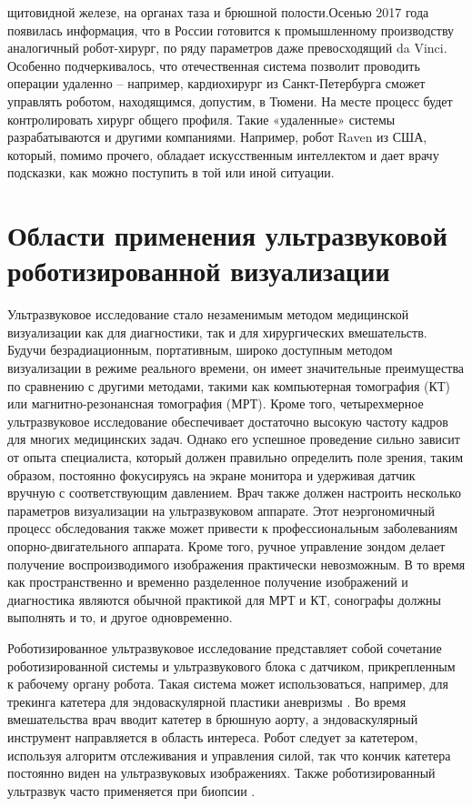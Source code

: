 щитовидной железе, на органах таза и брюшной полости.Осенью 2017 года появилась информация, что в России готовится к промышленному производству аналогичный робот-хирург, по ряду параметров даже превосходящий da Vinci. Особенно подчеркивалось, что отечественная система позволит проводить операции удаленно – например, кардиохирург из Санкт-Петербурга сможет управлять роботом, находящимся, допустим, в Тюмени. На месте процесс будет контролировать хирург общего профиля. Такие «удаленные» системы разрабатываются и другими компаниями. Например, робот Raven из США, который, помимо прочего, обладает искусственным интеллектом и дает врачу подсказки, как можно поступить в той или иной ситуации.


\section{Области применения ультразвуковой роботизированной визуализации}

Ультразвуковое исследование стало незаменимым методом медицинской визуализации как для диагностики, так и для хирургических вмешательств. Будучи безрадиационным, портативным, широко доступным методом визуализации в режиме реального времени, он имеет значительные преимущества по сравнению с другими методами, такими как компьютерная томография (КТ) или магнитно-резонансная томография (МРТ). Кроме того, четырехмерное ультразвуковое исследование обеспечивает достаточно высокую частоту кадров для многих медицинских задач. Однако его успешное проведение сильно зависит от опыта специалиста, который должен правильно определить поле зрения, таким образом, постоянно фокусируясь на экране монитора и удерживая датчик вручную с соответствующим давлением. Врач также должен настроить несколько параметров визуализации на ультразвуковом аппарате. Этот неэргономичный процесс обследования также может привести к профессиональным заболеваниям опорно-двигательного аппарата. Кроме того, ручное управление зондом делает получение воспроизводимого изображения практически невозможным. В то время как пространственно и временно разделенное получение изображений и диагностика являются обычной практикой для МРТ и КТ, сонографы должны выполнять и то, и другое одновременно.

Роботизированное ультразвуковое исследование представляет собой сочетание роботизированной системы и ультразвукового блока с датчиком, прикрепленным к рабочему органу робота. Такая система может использоваться, например, для трекинга катетера для эндоваскулярной пластики аневризмы \cite{litlink5}. Во время вмешательства врач вводит катетер в брюшную аорту, а эндоваскулярный инструмент направляется в область интереса. Робот следует за катетером, используя алгоритм отслеживания и управления силой, так что кончик катетера постоянно виден на ультразвуковых изображениях. Также роботизированный ультразвук часто применяется при биопсии \cite{litlink6}.

